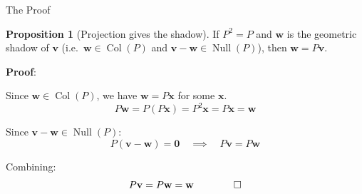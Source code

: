 \documentclass[10pt]{beamer}
\theoremstyle{definition}
\newtheorem{prop}{Proposition}[section]
\begin{document}
\begin{frame}{The Proof}

\begin{prop}[Projection gives the shadow]
If $P^2 = P$ and $\mathbf{w}$ is the geometric shadow of $\mathbf v$ (i.e.\ $\mathbf{w} \in \operatorname{Col}(P)$ and $\mathbf{v} - \mathbf{w} \in \operatorname{Null}(P)$), then $\mathbf{w} = P\mathbf{v}$.
\end{prop}

\textbf{Proof}:

Since $\mathbf{w} \in \operatorname{Col}(P)$, we have $\mathbf{w} = P\mathbf{x}$ for some $\mathbf{x}$.
$$P\mathbf{w} = P(P\mathbf{x}) = P^2\mathbf{x} = P\mathbf{x} = \mathbf{w}$$

Since $\mathbf{v} - \mathbf{w} \in \operatorname{Null}(P)$:
$$P(\mathbf{v} - \mathbf{w}) = \mathbf{0} \quad\implies\quad P\mathbf{v} = P\mathbf{w}$$

Combining:
$$P\mathbf{v} = P\mathbf{w} = \mathbf{w} \qquad \qed$$

\end{frame}
\end{document}

